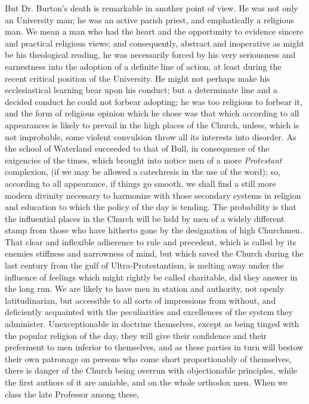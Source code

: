 But Dr.
Burton's death is remarkable in another point of view. He was not only
an University man; he was an active parish priest, and emphatically a
religious man. We mean a man who had the heart and the opportunity to
evidence sincere and practical religious views; and consequently,
abstract and inoperative as might be his theological reading, he was
necessarily forced by his very seriousness and earnestness into the
adoption of a definite line of action, at least during the recent
critical position of the University. He might not perhaps make his
ecclesiastical learning bear upon his conduct; but a determinate line
and a decided conduct he could not forbear adopting; he was too
religious to forbear it, and the form of religious opinion which he
chose was that which according to all appearances is likely to prevail
in the high places of the Church, unless, which is not improbable, some
violent convulsion throw all its interests into disorder. As the school
of Waterland succeeded to that of Bull, in consequence of the exigencies
of the times, which brought into notice men of a more \emph{Protestant}
complexion, (if we may be allowed a catechresis in the use of the word);
so, according to all appearance, if things go smooth, we shall find a
still more modern divinity necessary to harmonize with those secondary
systems in religion and education to which the policy of the day is
tending. The probability is that the influential places in the Church
will be held by men of a widely different stamp from those who have
hitherto gone by the designation of high Churchmen. That clear and
inflexible adherence to rule and precedent, which is called by its
enemies stiffness and narrowness of mind, but which saved the Church
during the last century from the gulf of Ultra-Protestantism, is melting
away under the influence of feelings which might rightly be called
charitable, did they answer in the long run. We are likely to have men
in station and authority, not openly latitudinarian, but accessible to
all sorts of impressions from without, and deficiently acquainted with
the peculiarities and excellences of the system they administer.
Unexceptionable in doctrine themselves, except as being tinged with the
popular religion of the day, they will give their confidence and their
preferment to men inferior to themselves, and as these parties in turn
will bestow their own patronage on persons who come short proportionably
of themselves, there is danger of the Church being overrun with
objectionable principles, while the first authors of it are amiable, and
on the whole orthodox men. When we class the late Professor among these,
